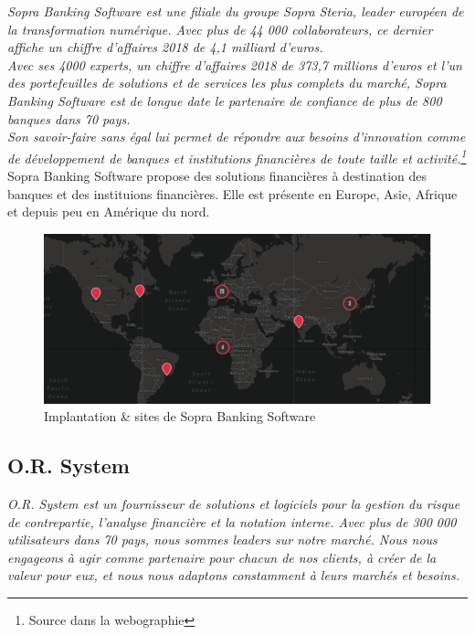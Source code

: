 \textit{Sopra Banking Software est une filiale du groupe Sopra Steria, leader européen de la transformation numérique. Avec plus de 44 000 collaborateurs, ce dernier affiche un chiffre d’affaires 2018 de 4,1 milliard d’euros.}\\

\textit{Avec ses 4000 experts, un chiffre d’affaires 2018 de 373,7 millions d’euros et l’un des portefeuilles de solutions et de services les plus complets du marché, Sopra Banking Software est de longue date le partenaire de confiance de plus de 800 banques dans 70 pays.}\\

\textit{Son savoir-faire sans égal lui permet de répondre aux besoins d’innovation comme de développement de banques et institutions financières de toute taille et activité.\footnote{Source dans la webographie}}\\

Sopra Banking Software propose des solutions financières à destination des banques et des instituions financières. Elle est présente en Europe, Asie, Afrique et depuis peu en Amérique du nord. 


\begin{figure}[h]
\centering
\includegraphics[scale=0.6]{resources/SBSImplantSites.png}
\caption{Implantation \& sites de Sopra Banking Software}
\label{SBSImplantSites}
\end{figure}

\newpage
\subsection{O.R. System}

\textit{O.R. System est un fournisseur de solutions et logiciels pour la gestion du risque de contrepartie, l’analyse financière et la notation interne. Avec plus de 300 000 utilisateurs dans 70 pays, nous sommes leaders sur notre marché. Nous nous engageons à agir comme partenaire pour chacun de nos clients, à créer de la valeur pour eux, et nous nous adaptons constamment à leurs marchés et besoins.}\\

